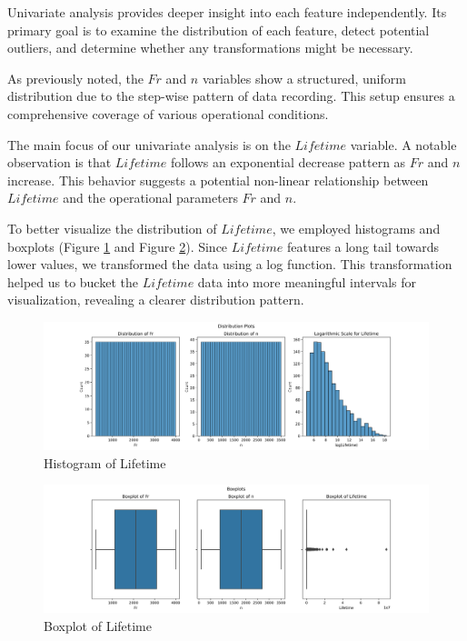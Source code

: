 Univariate analysis provides deeper insight into each feature independently. Its primary goal is to examine the distribution of each feature, detect potential outliers, and determine whether any transformations might be necessary.

As previously noted, the \(Fr\) and \(n\) variables show a structured, uniform distribution due to the step-wise pattern of data recording. This setup ensures a comprehensive coverage of various operational conditions.

The main focus of our univariate analysis is on the \(Lifetime\) variable. A notable observation is that \(Lifetime\) follows an exponential decrease pattern as \(Fr\) and \(n\) increase. This behavior suggests a potential non-linear relationship between \(Lifetime\) and the operational parameters \(Fr\) and \(n\).

To better visualize the distribution of \(Lifetime\), we employed histograms and boxplots (Figure \ref{fig:bearings-histogram} and Figure \ref{fig:bearings-boxplot}). Since \(Lifetime\) features a long tail towards lower values, we transformed the data using a log function. This transformation helped us to bucket the \(Lifetime\) data into more meaningful intervals for visualization, revealing a clearer distribution pattern.

\begin{figure}[ht]
    \centering
    \includegraphics[width=\textwidth]{assets/bearings-eda/histogram.png}
    \caption{Histogram of Lifetime}
    \label{fig:bearings-histogram}
\end{figure}

\begin{figure}[ht]
    \centering
    \includegraphics[width=\textwidth]{assets/bearings-eda/boxplot.png}
    \caption{Boxplot of Lifetime}
    \label{fig:bearings-boxplot}
\end{figure}

